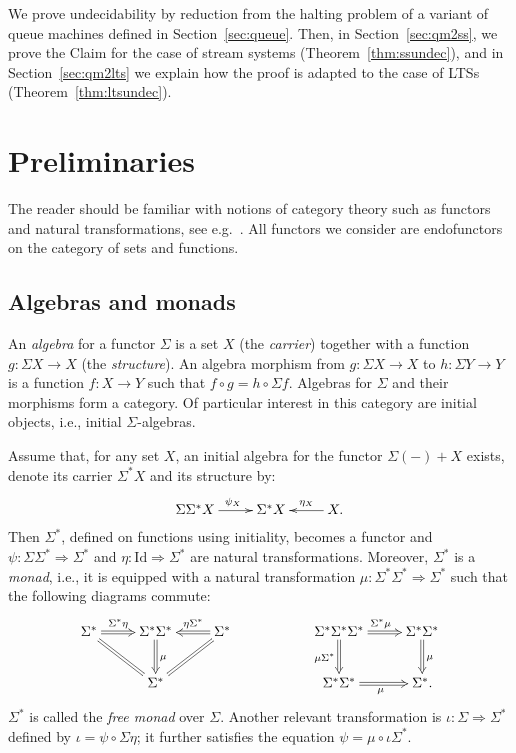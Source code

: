 \documentclass[adraft,copyright,creativecommons]{eptcs}
\newcommand{\To}{\Longrightarrow}
\newcommand{\Ss}{\Sigma^*}
\renewcommand{\S}{\Sigma}
\newcommand{\Id}{\textrm{Id}}
\begin{document}
We prove undecidability by reduction from the halting problem of a variant of queue machines defined in Section~\ref{sec:queue}. Then, in Section~\ref{sec:qm2ss}, we prove the Claim for the case of stream systems (Theorem~\ref{thm:ssundec}), and in Section~\ref{sec:qm2lts} we explain how the proof is adapted to the case of LTSs (Theorem~\ref{thm:ltsundec}).



\section{Preliminaries}

The reader should be familiar with notions of category theory such as functors and natural transformations, see e.g.~\cite{maclane}. 
All functors we consider are endofunctors on the category of sets and functions.

\subsection{Algebras and monads}\label{sec:algebras}

An {\em algebra} for a functor $\S$ is a set $X$ (the {\em carrier}) together with a function $g:\S X\to X$ (the {\em structure}). An algebra morphism from $g:\S X\to X$ to $h:\S Y \to Y$ is a function $f:X\to Y$ such that $f\circ g = h\circ \S f$. Algebras for $\S$ and their morphisms form a category. Of particular interest in this category are initial objects, i.e., initial $\S$-algebras.

Assume that, for any set $X$, an initial algebra for the functor $\S(-)+X$ exists, denote its carrier $\Ss X$ and its structure by:
\[
	\xymatrix{\S\Ss X\ar[r]^{\psi_X} & \Ss X & X\ar[l]_-{\eta_X}.}
\]
Then $\Ss$, defined on functions using initiality, becomes a functor and $\psi:\S\Ss\To\Ss$ and $\eta:\Id\To\Ss$ are natural transformations. Moreover, $\Ss$ is a {\em monad}, i.e., it is equipped with a natural transformation $\mu:\Ss\Ss\To\Ss$ such that the following diagrams commute:
\begin{equation}\label{eq:monadlaws}
\vcenter{
	\xymatrix{\Ss\ar@{=>}[r]^-{\Ss\eta}\ar@{=}[rd] & \Ss\Ss\ar@{=>}[d]^{\mu} & \Ss\ar@{=>}[l]_-{\eta\Ss}\ar@{=}[ld] & & \Ss\Ss\Ss\ar@{=>}[r]^{\Ss\mu}\ar@{=>}[d]_{\mu\Ss} & \Ss\Ss\ar@{=>}[d]^{\mu} \\ & \Ss & & & 
 \Ss\Ss\ar@{=>}[r]_{\mu} & \Ss.}
}
\end{equation}
$\Ss$ is called the {\em free monad} over $\S$. Another relevant transformation is $\iota:\S\To\Ss$ defined by $\iota = \psi \circ \S\eta$; it further satisfies the equation $\psi = \mu\circ\iota\Ss$.
\end{document}
